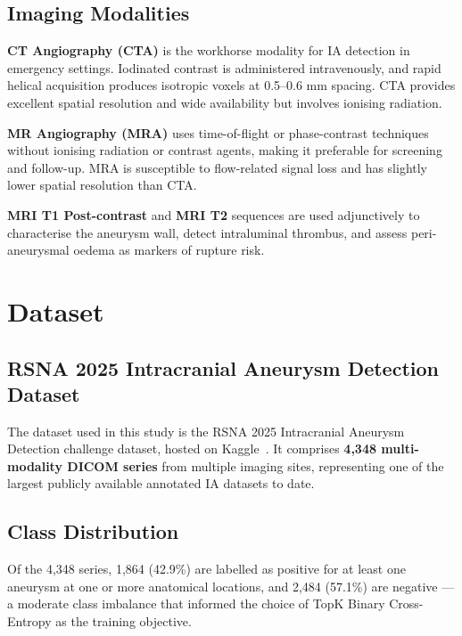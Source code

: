 \documentclass[journal]{IEEEtran}
\begin{document}
\subsection{Imaging Modalities}

\textbf{CT Angiography (CTA)} is the workhorse modality for IA detection in
emergency settings. Iodinated contrast is administered intravenously, and rapid
helical acquisition produces isotropic voxels at 0.5--0.6 mm spacing.
CTA provides excellent spatial resolution and wide availability but involves
ionising radiation.

\textbf{MR Angiography (MRA)} uses time-of-flight or phase-contrast techniques
without ionising radiation or contrast agents, making it preferable for
screening and follow-up. MRA is susceptible to flow-related signal loss and
has slightly lower spatial resolution than CTA.

\textbf{MRI T1 Post-contrast} and \textbf{MRI T2} sequences are used
adjunctively to characterise the aneurysm wall, detect intraluminal thrombus,
and assess peri-aneurysmal oedema as markers of rupture risk.



\section{Dataset}
\label{sec:dataset}

\subsection{RSNA 2025 Intracranial Aneurysm Detection Dataset}

The dataset used in this study is the RSNA 2025 Intracranial Aneurysm Detection
challenge dataset, hosted on Kaggle~\cite{rsna2025}. It comprises \textbf{4,348
multi-modality DICOM series} from multiple imaging sites, representing one of the
largest publicly available annotated IA datasets to date.

\subsection{Class Distribution}

Of the 4,348 series, 1,864 (42.9\%) are labelled as positive for at least one
aneurysm at one or more anatomical locations, and 2,484 (57.1\%) are negative ---
a moderate class imbalance that informed the choice of TopK Binary Cross-Entropy
as the training objective.
\end{document}
